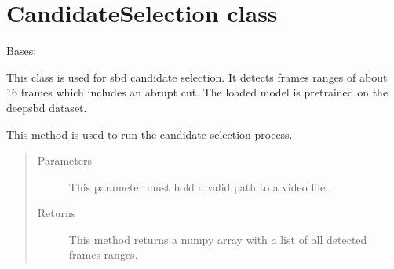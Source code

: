\documentclass[letterpaper,10pt,english,openany,oneside]{sphinxmanual}
\begin{document}
\section{CandidateSelection class}
\label{\detokenize{CandidateSelection:candidateselection-class}}\label{\detokenize{CandidateSelection::doc}}

\begin{fulllineitems}
\label{\detokenize{CandidateSelection:sbd.DeepSBD.CandidateSelection}}
Bases: 

This class is used for sbd candidate selection. It detects frames ranges of about 16 frames which includes an
abrupt cut. The loaded model is pre\sphinxhyphen{}trained on the deepsbd dataset.

\begin{fulllineitems}
\label{\detokenize{CandidateSelection:sbd.DeepSBD.CandidateSelection.run}}
This method is used to run the candidate selection process.
\begin{quote}\begin{description}
\item[{Parameters}] \leavevmode
{} \textendash{} This parameter must hold a valid path to a video file.

\item[{Returns}] \leavevmode
This method returns a numpy array with a list of all detected frames ranges.

\end{description}\end{quote}

\end{fulllineitems}


\end{fulllineitems}
\end{document}
